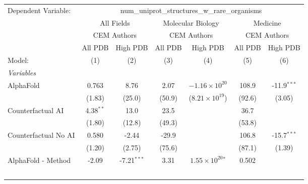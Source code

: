 \begingroup
\centering
\begin{tabular}{lcccccc}
   \tabularnewline \midrule \midrule
   Dependent Variable: & \multicolumn{6}{c}{num\_uniprot\_structures\_w\_rare\_organisms}\\
 & \multicolumn{2}{c}{All Fields} & \multicolumn{2}{c}{Molecular Biology} & \multicolumn{2}{c}{Medicine} \\
\cmidrule(lr){2-3} \cmidrule(lr){4-5} \cmidrule(lr){6-7}
 & \multicolumn{2}{c}{CEM Authors} & \multicolumn{2}{c}{CEM Authors} & \multicolumn{2}{c}{CEM Authors} \\
\cmidrule(lr){2-3} \cmidrule(lr){4-5} \cmidrule(lr){6-7}
 & \multicolumn{1}{c}{All PDB} & \multicolumn{1}{c}{High PDB} & \multicolumn{1}{c}{All PDB} & \multicolumn{1}{c}{High PDB} & \multicolumn{1}{c}{All PDB} & \multicolumn{1}{c}{High PDB} \\
\cmidrule(lr){2-2} \cmidrule(lr){3-3} \cmidrule(lr){4-4} \cmidrule(lr){5-5} \cmidrule(lr){6-6} \cmidrule(lr){7-7}
   Model:                                                     & (1)         & (2)           & (3)     & (4)                         & (5)           & (6)\\  
   \midrule
   \emph{Variables}\\
   AlphaFold                                                  & 0.763       & 8.76          & 2.07    & $-1.16\times 10^{20}$       & 108.9         & -11.9$^{***}$\\   
                                                              & (1.83)      & (25.0)        & (50.9)  & ($8.21\times 10^{19}$)      & (92.6)        & (3.05)\\   
   Counterfactual AI                                          & 4.38$^{**}$ & 13.0          & 23.5    &                             & 36.7          &   \\   
                                                              & (1.80)      & (12.8)        & (49.3)  &                             & (53.8)        &   \\   
   Counterfactual No AI                                       & 0.580       & -2.44         & -29.9   &                             & 106.8         & -15.7$^{***}$\\   
                                                              & (1.20)      & (2.75)        & (75.6)  &                             & (87.1)        & (1.39)\\   
   AlphaFold - Method                                         & -2.09       & -7.21$^{***}$ & 3.31    & $1.55\times 10^{20}$$^{*}$  & 0.502         &   \\   
$$
\end{tabular}
